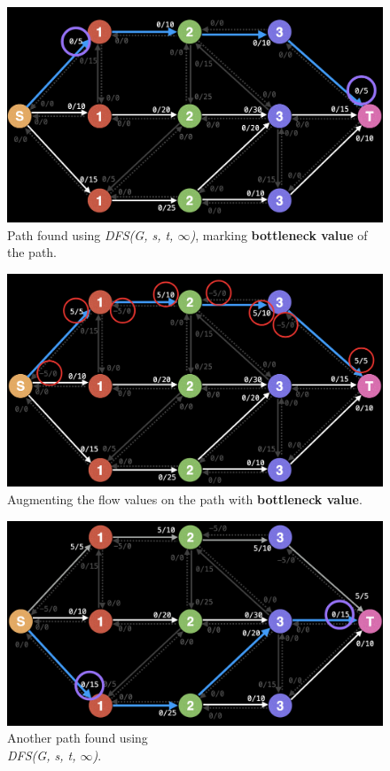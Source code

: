 \documentclass{report}
\begin{document}
\begin{figure}[!htb]
    \includegraphics[width=\textwidth]{assets/visual03.png}
    \centering
    \captionsetup{justification=centering,margin=2cm}
    \caption{Path found using \textit{DFS(G, s, t, $\infty$)}, marking \textbf{bottleneck value} of the path.}
\end{figure}
\begin{figure}[!htb]
    \includegraphics[width=\textwidth]{assets/visual04.png}
    \centering
    \captionsetup{justification=centering,margin=2cm}
    \caption{Augmenting the flow values on the path with \textbf{bottleneck value}.}
\end{figure}
\pagebreak
\begin{figure}[!htb]
    \includegraphics[width=\textwidth]{assets/visual05.png}
    \centering
    \captionsetup{justification=centering,margin=2cm}
    \caption{Another path found using \\\textit{DFS(G, s, t, $\infty$)}.}
\end{figure}
\end{document}
